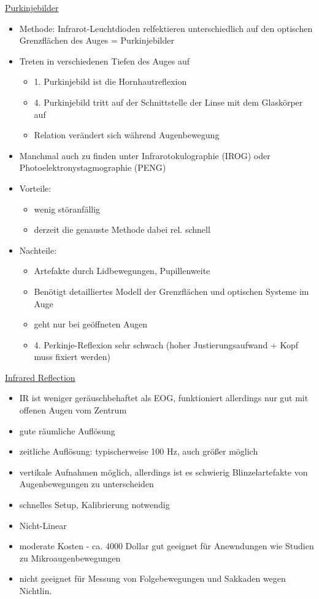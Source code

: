 \documentclass[a4paper,10pt,oneside]{article}
\begin{document}
\underline{Purkinjebilder} \\
	\begin{itemize}
		\item Methode: Infrarot-Leuchtdioden relfektieren unterschiedlich auf den optischen Grenzflächen des Auges = Purkinjebilder
		\item Treten in verschiedenen Tiefen des Auges auf
			\begin{itemize}
				\item 1. Purkinjebild ist die Hornhautreflexion
				\item 4. Purkinjebild tritt auf der Schnittstelle der Linse mit dem Glaskörper auf
				\item Relation verändert sich während Augenbewegung
			\end{itemize}
		\item Manchmal auch zu finden unter Infrarotokulographie (IROG) oder Photoelektronystagmographie (PENG)
		\item Vorteile:
			\begin{itemize}
				\item wenig störanfällig
				\item derzeit die genauste Methode dabei rel. schnell
			\end{itemize}
		\item Nachteile:
			\begin{itemize}
				\item Artefakte durch Lidbewegungen, Pupillenweite
				\item Benötigt detailliertes Modell der Grenzflächen und optischen Systeme im Auge
				\item geht nur bei geöffneten Augen
				\item 4. Perkinje-Reflexion sehr schwach (hoher Justierungsaufwand + Kopf muss fixiert werden)
			\end{itemize}
	\end{itemize}
	
\underline{Infrared Reflection} \\
	\begin{itemize}
		\item IR ist weniger geräuschbehaftet als EOG, funktioniert allerdings nur gut mit offenen Augen vom Zentrum
		\item gute räumliche Auflösung
		\item zeitliche Auflösung: typischerweise 100 Hz, auch größer möglich
		\item vertikale Aufnahmen möglich, allerdings ist es schwierig Blinzelartefakte von Augenbewegungen zu unterscheiden
		\item schnelles Setup, Kalibrierung notwendig
		\item Nicht-Linear
		\item moderate Kosten - ca. 4000 Dollar
		\itee gut geeignet für Anewndungen wie Studien zu Mikroaugenbewegungen
		\item nicht geeignet für Messung von Folgebewegungen und Sakkaden wegen Nichtlin. 
	\end{itemize}
 		
\end{document}
